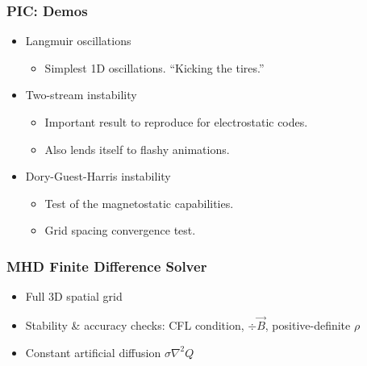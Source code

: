 \documentclass[aspectratio=169]{beamer}
\begin{document}

\begin{frame}
\frametitle{PIC: Demos}

\begin{itemize}
\item Langmuir oscillations
\begin{itemize}
    \item Simplest 1D oscillations. ``Kicking the tires.''
\end{itemize}
\item Two-stream instability
\begin{itemize}
    \item Important result to reproduce for electrostatic codes.
    \item Also lends itself to flashy animations.
\end{itemize}
\item Dory-Guest-Harris instability
\begin{itemize}
    \item Test of the magnetostatic capabilities.
    \item Grid spacing convergence test.
\end{itemize}
\end{itemize}

\end{frame}

 
\begin{frame}
\frametitle{MHD Finite Difference Solver}

\begin{itemize}
\item Full 3D spatial grid
\item Stability \& accuracy checks: CFL condition, $\div \vec B$, positive-definite $\rho$
\item Constant artificial diffusion $\sigma \nabla ^2 Q$
\end{itemize}

\end{frame}

\end{document}
